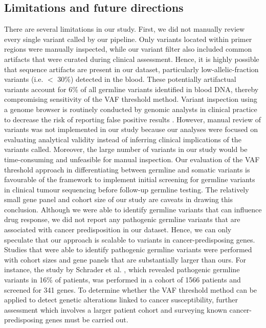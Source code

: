 \subsection{Limitations and future directions}

There are several limitations in our study. First, we did not manually review every single variant called by our pipeline. Only variants located within primer regions were manually inspected, while our variant filter also included common artifacts that were curated during clinical assessment. Hence, it is highly possible that sequence artifacts are present in our dataset, particularly low-allelic-fraction variants (i.e. $<$ 30\%) detected in the blood. These potentially artifactual variants account for 6\% of all germline variants identified in blood DNA, thereby compromising sensitivity of the VAF threshold method. Variant inspection using a genome browser is routinely conducted by genomic analysts in clinical practice to decrease the risk of reporting false positive results \cite{Strom2016, Garofalo2016}. However, manual review of variants was not implemented in our study because our analyses were focused on evaluating analytical validity instead of inferring clinical implications of the variants called. Moreover, the large number of variants in our study would be time-consuming and unfeasible for manual inspection. Our evaluation of the VAF threshold approach in differentiating between germline and somatic variants is favourable of the framework to implement initial screening for germline variants in clinical tumour sequencing before follow-up germline testing. The relatively small gene panel and cohort size of our study are caveats in drawing this conclusion. Although we were able to identify germline variants that can influence drug response, we did not report any pathogenic germline variants that are associated with cancer predisposition in our dataset. Hence, we can only speculate that our approach is scalable to variants in cancer-predisposing genes. Studies that were able to identify pathogenic germline variants were performed with cohort sizes and gene panels that are substantially larger than ours. For instance, the study by Schrader et al. \cite{Schrader2015}, which revealed pathogenic germline variants in 16\% of patients, was performed in a cohort of 1566 patients and screened for 341 genes. To determine whether the VAF threshold method can be applied to detect genetic alterations linked to cancer susceptibility, further assessment which involves a larger patient cohort and surveying known cancer-predisposing genes must be carried out.

